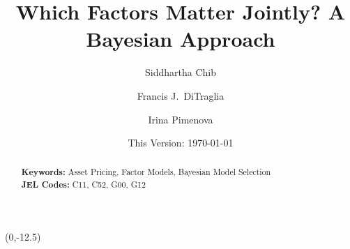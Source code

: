 \documentclass[12pt]{article}
\begin{document}
\title{Which Factors Matter Jointly? A Bayesian Approach}
\author[1]{Siddhartha Chib}
\author[2]{Francis J.\ DiTraglia}
\author[2]{Irina Pimenova\normalsize}


\date{\small This Version: \today}
\maketitle  
\begin{abstract}
  \singlespacing
	

  	\bigskip
	\noindent\textbf{Keywords:} Asset Pricing, Factor Models, Bayesian Model Selection\\
	\medskip
  \noindent\textbf{JEL Codes:} C11, C52, G00, G12 
\end{abstract}

\begin{textblock}{2}(0,-12.5)
\begin{rotate}{0}
\end{rotate}
\end{textblock}









%
\end{document}
